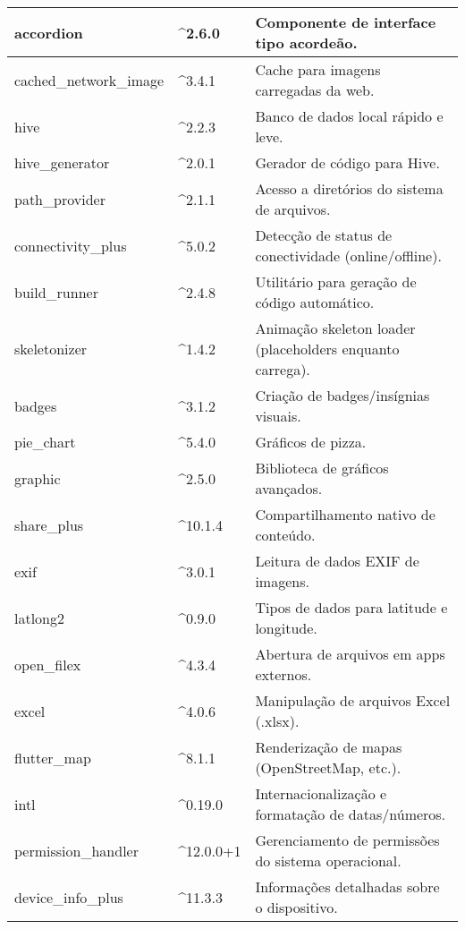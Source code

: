 \begin{table}[H]
\begin{tabular}{|p{4cm}|p{2.5cm}|p{8cm}|}
    accordion & \^{}2.6.0 & Componente de interface tipo acordeão. \\ \hline
    cached\_network\_image & \^{}3.4.1 & Cache para imagens carregadas da web. \\ \hline
    hive & \^{}2.2.3 & Banco de dados local rápido e leve. \\ \hline
    hive\_generator & \^{}2.0.1 & Gerador de código para Hive. \\ \hline
    path\_provider & \^{}2.1.1 & Acesso a diretórios do sistema de arquivos. \\ \hline
    connectivity\_plus & \^{}5.0.2 & Detecção de status de conectividade (online/offline). \\ \hline
    build\_runner & \^{}2.4.8 & Utilitário para geração de código automático. \\ \hline
    skeletonizer & \^{}1.4.2 & Animação skeleton loader (placeholders enquanto carrega). \\ \hline
    badges & \^{}3.1.2 & Criação de badges/insígnias visuais. \\ \hline
    pie\_chart & \^{}5.4.0 & Gráficos de pizza. \\ \hline
    graphic & \^{}2.5.0 & Biblioteca de gráficos avançados. \\ \hline
    share\_plus & \^{}10.1.4 & Compartilhamento nativo de conteúdo. \\ \hline
    exif & \^{}3.0.1 & Leitura de dados EXIF de imagens. \\ \hline
    latlong2 & \^{}0.9.0 & Tipos de dados para latitude e longitude. \\ \hline
    open\_filex & \^{}4.3.4 & Abertura de arquivos em apps externos. \\ \hline
    excel & \^{}4.0.6 & Manipulação de arquivos Excel (.xlsx). \\ \hline
    flutter\_map & \^{}8.1.1 & Renderização de mapas (OpenStreetMap, etc.). \\ \hline
    intl & \^{}0.19.0 & Internacionalização e formatação de datas/números. \\ \hline
    permission\_handler & \^{}12.0.0+1 & Gerenciamento de permissões do sistema operacional. \\ \hline
    device\_info\_plus & \^{}11.3.3 & Informações detalhadas sobre o dispositivo. \\ \hline
    \end{tabular}
    \label{tab:dependencias_flutter}
\end{table}
    
